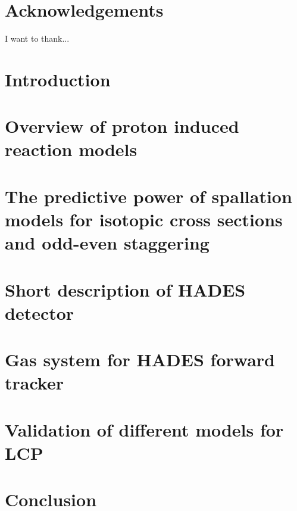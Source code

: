 \documentclass[12pt]{report}
\begin{document}
\chapter*{Acknowledgements}
I want to thank...
 

\chapter{Introduction}

 
\chapter{Overview of proton induced reaction models}

 \chapter{The predictive power of spallation models for isotopic cross
sections and odd-even staggering}

\chapter{Short description of HADES detector}

\chapter{Gas system for HADES forward tracker}

 \chapter{Validation of different models for LCP}
 
\chapter{Conclusion}

\printbibliography
\end{document}

